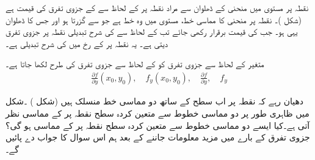نقطہ  پر مستوی  میں منحنی  کے ڈھلوان  سے مراد نقطہ  پر  کے لحاظ سے  کے جزوی تفرق کی قیمت ہے (شکل )۔  نقطہ  پر منحنی کا مماسی خط، مستوی  میں وہ خط ہے جو  سے گزرتا ہو اور جس کا ڈھلوان یہی ہو۔ جب  کی قیمت برقرار  رکھی جائے  تب  کے لحاظ سے  کی شرح تبدیلی نقطہ  پر جزوی تفرق     دیتی ہے۔ یہ نقطہ  پر  کے رخ میں   کی شرح تبدیلی  ہے۔

متغیر  کے لحاظ سے جزوی تفرق کو  کے لحاظ سے جزوی تفرق کی طرح لکھا جاتا ہے۔
\begin{align*}
\frac{\partial f}{\partial y}(x_0,y_0),\quad f_y(x_0,y_0),\quad \frac{\partial f}{\partial y},\quad f_y
\end{align*}

دھیان رہے کہ نقطہ  پر اب سطح  کے ساتھ دو مماسی خط منسلک ہیں (شکل ) ۔شکل  میں ظاہری طور پر دو مماسی خطوط  سے متعین کردہ   سطح نقطہ  پر  کے مماسی نظر آتی ہے۔کیا  ایسے دو  مماسی  خطوط سے متعین  کردہ سطح نقطہ  پر  کے مماسی ہو گی؟  جزوی تفرق کے بارے میں مزید معلومات جاننے کے بعد ہم اس سوال کا جواب دے پائیں گے۔

